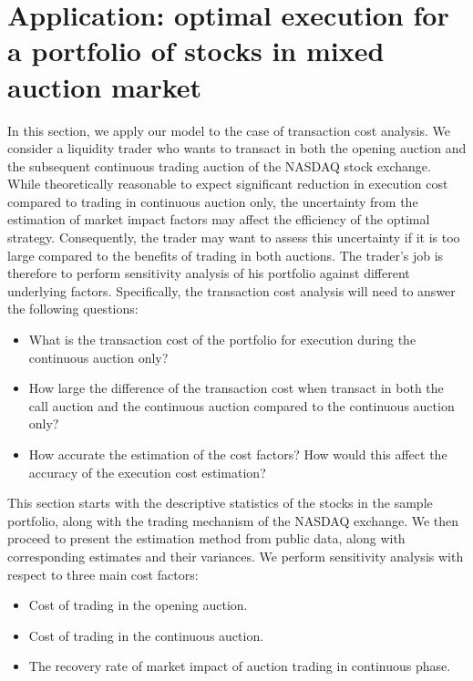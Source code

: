 
\section{Application: optimal execution for a portfolio of stocks in mixed auction market}\label{sec:EmpiricalAnalysis}

In this section, we apply our model to the case of transaction cost analysis. We consider a liquidity trader who wants to transact in both the opening auction and the subsequent continuous trading auction of the NASDAQ stock exchange. While theoretically reasonable to expect significant reduction in execution cost compared to trading in continuous auction only, the uncertainty from the estimation of market impact factors may affect the efficiency of the optimal strategy. Consequently, the trader may want to assess this uncertainty if it is too large compared to the benefits of trading in both auctions. The trader's job is therefore to perform sensitivity analysis of his portfolio against different underlying factors. Specifically, the transaction cost analysis will need to answer the following questions:

\begin{itemize}
  \item What is the transaction cost of the portfolio for execution during the continuous auction only?
  \item How large the difference of the transaction cost when transact in both the call auction and the continuous auction compared to the continuous auction only?
  \item How accurate the estimation of the cost factors? How would this affect the accuracy of the execution cost estimation?
\end{itemize}

This section starts with the descriptive statistics of the stocks in the sample portfolio, along with the trading mechanism of the NASDAQ exchange. We then proceed to present the estimation method from public data, along with corresponding estimates and their variances. We perform sensitivity analysis with respect to three main cost factors:
\begin{itemize}
  \item Cost of trading in the opening auction.
  \item Cost of trading in the continuous auction.
  \item The recovery rate of market impact of auction trading in continuous phase.
\end{itemize}

